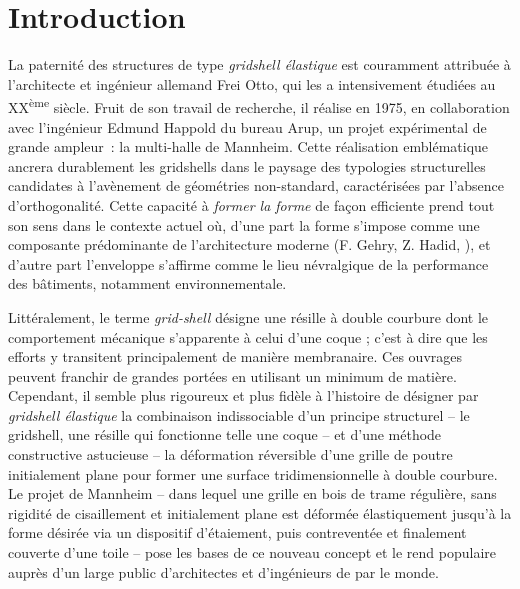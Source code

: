 




\chapter{Introduction}\label{chp:intro}

La paternité des structures de type \emph{gridshell élastique} est couramment attribuée à l'architecte et ingénieur allemand Frei Otto, qui les a intensivement étudiées au XX\textsuperscript{ème} siècle. Fruit de son travail de recherche, il réalise en 1975, en collaboration avec l'ingénieur Edmund Happold du bureau Arup, un projet expérimental de grande ampleur~: la multi-halle de Mannheim. Cette réalisation emblématique ancrera durablement les gridshells dans le paysage des typologies structurelles candidates à l'avènement de géométries non-standard, caractérisées par l'absence d'orthogonalité. Cette capacité à \emph{former la forme} de façon efficiente prend tout son sens dans le contexte actuel où, d'une part la forme s'impose comme une composante prédominante de l'architecture moderne (F. Gehry, Z. Hadid, \telp{}), et d'autre part l'enveloppe s'affirme comme le lieu névralgique de la performance des bâtiments, notamment environnementale.

Littéralement, le terme \emph{grid-shell} désigne une résille à double courbure dont le comportement mécanique s'apparente à celui d'une coque ; c'est à dire que les efforts y transitent principalement de manière membranaire. Ces ouvrages peuvent franchir de grandes portées en utilisant un minimum de matière. Cependant, il semble plus rigoureux et plus fidèle à l'histoire de désigner par \emph{gridshell élastique} la combinaison indissociable d'un principe structurel -- le gridshell, une résille qui fonctionne telle une coque -- et d'une méthode constructive astucieuse -- la déformation réversible d'une grille de poutre initialement plane pour former une surface tridimensionnelle à double courbure. Le projet de Mannheim -- dans lequel une grille en bois de trame régulière, sans rigidité de cisaillement et initialement plane est déformée élastiquement jusqu'à la forme désirée via un dispositif d'étaiement, puis contreventée et finalement couverte d'une toile -- pose les bases de ce nouveau concept et le rend populaire auprès d'un large public d'architectes et d'ingénieurs de par le monde.

